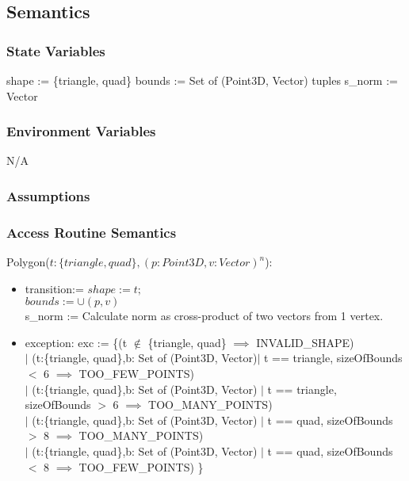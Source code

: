 \documentclass[12pt, titlepage]{article}
\begin{document}
\subsection{Semantics}
\subsubsection{State Variables}
shape := \{triangle, quad\}
bounds := Set of (Point3D, Vector) tuples
s\_norm := Vector

\subsubsection{Environment Variables}
N/A

\subsubsection{Assumptions}

\subsubsection{Access Routine Semantics}
\noindent Polygon($t:\{triangle, quad\}, (p:Point3D, v:Vector)^n$):
\begin{itemize}
	\item transition:= $shape := t;$ \\
	$bounds := \cup (p,v)$ \\
	s\_norm := Calculate norm as cross-product of two vectors from 1 vertex.
	\item exception: exc := \{(t $\notin$ \{triangle, quad\} $\implies$ 
	INVALID\_SHAPE) \\ $|$ (t:\{triangle, quad\},b: Set of (Point3D, Vector)$|$ 
	t == triangle, sizeOfBounds $<$ 6 $\implies$ TOO\_FEW\_POINTS) \\ $|$ 
	(t:\{triangle, quad\},b: Set of (Point3D, Vector) $|$ t == triangle, 
	sizeOfBounds $>$ 6 $\implies$ TOO\_MANY\_POINTS) \\ $|$ 
	(t:\{triangle, quad\},b: Set of (Point3D, Vector) $|$ t == quad, 
	sizeOfBounds $>$ 8 $\implies$ TOO\_MANY\_POINTS) \\ $|$ 
	(t:\{triangle, quad\},b: Set of (Point3D, Vector) $|$ t == quad, 
	sizeOfBounds $<$ 8 $\implies$ TOO\_FEW\_POINTS)  \}\\
\end{itemize}
\end{document}
